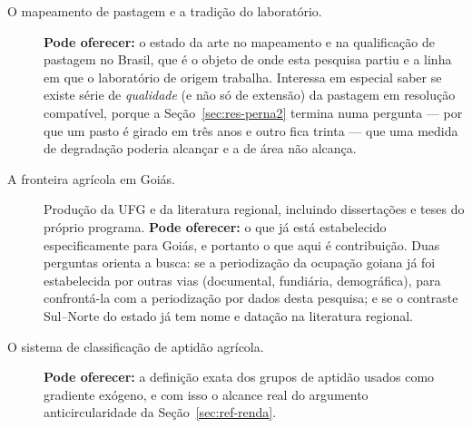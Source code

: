 \begin{description}
\item[O mapeamento de pastagem e a tradição do laboratório.]\leavevmode
{}
\textbf{Pode oferecer:} o estado da arte no mapeamento e na qualificação de
pastagem no Brasil, que é o objeto de onde esta pesquisa partiu e a linha em
que o laboratório de origem trabalha. Interessa em especial saber se existe
série de \emph{qualidade} (e não só de extensão) da pastagem em resolução
compatível, porque a Seção~\ref{sec:res-perna2} termina numa pergunta ---
por que um pasto é girado em três anos e outro fica trinta --- que uma medida
de degradação poderia alcançar e a de área não alcança.

\item[A fronteira agrícola em Goiás.] Produção da UFG e da literatura
regional, incluindo dissertações e teses do próprio programa.
\textbf{Pode oferecer:} o que já está estabelecido
especificamente para Goiás, e portanto o que aqui é contribuição. Duas
perguntas orienta a busca: se a periodização da ocupação goiana já foi
estabelecida por outras vias (documental, fundiária, demográfica), para
confrontá-la com a periodização por dados desta pesquisa; e se o contraste
Sul--Norte do estado já tem nome e datação na literatura regional.

\item[O sistema de classificação de aptidão agrícola.]\leavevmode
{}
\textbf{Pode oferecer:} a definição exata dos grupos de aptidão
usados como gradiente exógeno, e com isso o alcance real do argumento
anticircularidade da Seção~\ref{sec:ref-renda}.
\end{description}
